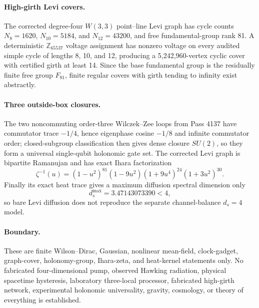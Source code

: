 \paragraph{High-girth Levi covers.}
The corrected degree-four $W(3,3)$ point--line Levi graph has cycle counts $N_8=1620$, $N_{10}=5184$, and $N_{12}=43200$, and free fundamental-group rank 81. A deterministic $\mathbb Z_{65537}$ voltage assignment has nonzero voltage on every audited simple cycle of lengths 8, 10, and 12, producing a 5,242,960-vertex cyclic cover with certified girth at least 14. Since the base fundamental group is the residually finite free group $F_{81}$, finite regular covers with girth tending to infinity exist abstractly.

\paragraph{Three outside-box closures.}
The two noncommuting order-three Wilczek--Zee loops from Pass 4137 have commutator trace $-1/4$, hence eigenphase cosine $-1/8$ and infinite commutator order; closed-subgroup classification then gives dense closure $SU(2)$, so they form a universal single-qubit holonomic gate set. The corrected Levi graph is bipartite Ramanujan and has exact Ihara factorization
\[
\zeta^{-1}(u)=(1-u^2)^{81}(1-9u^2)(1+9u^4)^{24}(1+3u^2)^{30}.
\]
Finally its exact heat trace gives a maximum diffusion spectral dimension only
\[
d_s^{\max}=3.47143073390<4,
\]
so bare Levi diffusion does not reproduce the separate channel-balance $d_s=4$ model.

\paragraph{Boundary.}
These are finite Wilson--Dirac, Gaussian, nonlinear mean-field, clock-gadget, graph-cover, holonomy-group, Ihara-zeta, and heat-kernel statements only. No fabricated four-dimensional pump, observed Hawking radiation, physical spacetime hysteresis, laboratory three-local processor, fabricated high-girth network, experimental holonomic universality, gravity, cosmology, or theory of everything is established.
